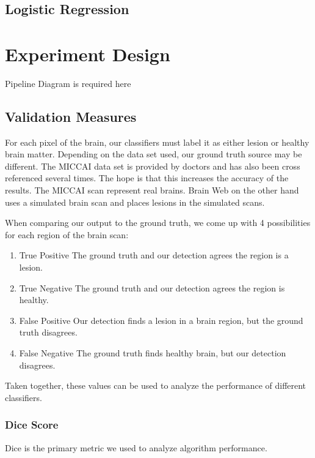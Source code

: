 \documentclass{article} %
\begin{document}
\subsection{Logistic Regression}

\section{Experiment Design}
Pipeline Diagram is required here

\subsection{Validation Measures}
For each pixel of the brain, our classifiers must label it as either lesion or healthy brain matter. Depending on the data set used, our ground truth source may be different. The MICCAI data set is provided by doctors and has also been cross referenced several times. The hope is that this increases the accuracy of the results. The MICCAI scan represent real brains. Brain Web on the other hand uses a simulated brain scan and places lesions in the simulated scans.

When comparing our output to the ground truth, we come up with 4 possibilities for each region of the brain scan:
\begin{enumerate}
  \item True Positive \newline
		The ground truth and our detection agrees the region is a lesion.
  \item True Negative \newline
  		The ground truth and our detection agrees the region is healthy.
  \item False Positive \newline
  		Our detection finds a lesion in a brain region, but the ground truth disagrees.
  \item False Negative \newline
  		The ground truth finds healthy brain, but our detection disagrees.
\end{enumerate} 
Taken together, these values can be used to analyze the performance of different classifiers. 
\subsubsection{Dice Score}
Dice is the primary metric we used to analyze algorithm performance. 
\end{document}
